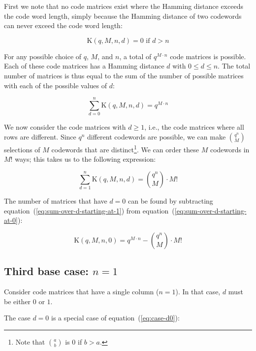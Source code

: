 \documentclass[a4paper]{article}
\newcommand{\codecount}{\mathrm{K}}
\begin{document}
First we note that no code matrices exist where the Hamming distance exceeds the code word length, simply because the Hamming distance of two codewords can never exceed the code word length:

\begin{equation}
\codecount(q, M, n, d) = 0 \mbox{ if } d>n
\label{eq:case-q1}
\end{equation}

For any possible choice of $q$, $M$, and $n$, a total of $q^{M \cdot n}$ code matrices is possible.
Each of these code matrices has a Hamming distance $d$ with $0 \le d \le n$.
The total number of matrices is thus equal to the sum of the number of possible matrices with each of the possible values of $d$:

\begin{equation}
\sum_{d=0}^{n} \codecount(q, M, n, d) = q^{M \cdot n}
\label{eq:sum-over-d-starting-at-0}
\end{equation}

We now consider the code matrices with $d \ge 1$, i.e., the code matrices where all rows are different.
Since $q^n$ different codewords are possible, we can make $\binom{q^n}{M}$ selections of $M$ codewords that are distinct\footnote{Note that $\binom{a}{b}$ is $0$ if $b>a$.}.
We can order these $M$ codewords in $M!$ ways; this takes us to the following expression:

\begin{equation}
\sum_{d=1}^{n} \codecount(q, M, n, d) = \binom{q^n}{M} \cdot M!
\label{eq:sum-over-d-starting-at-1}
\end{equation}

The number of matrices that have $d=0$ can be found by subtracting equation~(\ref{eq:sum-over-d-starting-at-1}) from equation~(\ref{eq:sum-over-d-starting-at-0}):

\begin{equation}
\codecount(q, M, n, 0) = q^{M \cdot n} - \binom{q^n}{M} \cdot M!
\label{eq:case-d0}
\end{equation}

\subsection{Third base case: $n=1$}

Consider code matrices that have a single column ($n=1$). In that case, $d$ must be either $0$ or $1$.

The case $d=0$ is a special case of equation~(\ref{eq:case-d0}):
\end{document}
